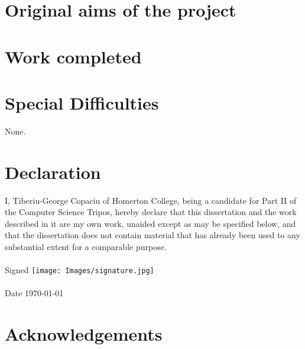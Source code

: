 \documentclass[12pt,a4paper,twoside,openright]{report}
\begin{document}
\section*{Original aims of the project}

\section*{Work completed}

\section*{Special Difficulties}
None.

\newpage
\section*{Declaration}
I, Tiberiu-George Copaciu of Homerton College,
being a candidate for Part II of the Computer Science Tripos,
hereby declare that this dissertation and the work described in it
are my own work, unaided except as may be specified below, and
that the dissertation does not contain material that has already
been used to any substantial extent for a comparable purpose.
\\ \\
Signed
\texttt{[image: Images/signature.jpg]}
\\ \\
Date \today

\newpage
\tableofcontents
\listoffigures
\listoftables
\newpage
\section*{Acknowledgements}





\appendix
{}

\nocite{pnn, polonium, pnn-parallel, sigmoidal, nonlinearities, DBLP:journals/corr/LuongPM15, 7266837, 2017arXiv171010903V, 279181, DBLP:journals/corr/KingmaB14, DBLP:journals/corr/VaswaniSPUJGKP17, REST-general, chollet2015keras, DBLP:journals/corr/IoffeS15, Rutkowski2004}

\end{document}
